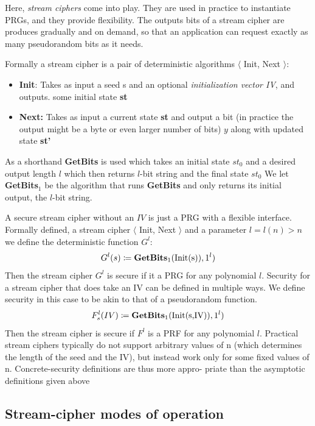 \documentclass[12pt]{article}
\begin{document}
Here, \emph{stream ciphers} come into play. They are used in practice to instantiate PRGs, and they provide flexibility. The outputs bits of a stream cipher are produces gradually and on demand, so that an application can request exactly as many pseudorandom bits as it needs.

Formally a stream cipher is a pair of deterministic algorithms $\langle$ Init, Next $\rangle$:
\begin{itemize}
\item \textbf{Init}: Takes as input a seed s and an optional \emph{initialization vector IV}, and outputs. some initial state \textbf{st}
\item \textbf{Next:} Takes as input a current state \textbf{st} and output a bit (in practice the output might be a byte or even larger number of bits) $y$ along with updated state  \textbf{st'}
\end{itemize}

As a shorthand \textbf{GetBits} is used which takes an initial state $st_0$ and a desired output length $l$ which then returns $l$-bit string and the final state $st_0$
We let \textbf{GetBits}$_1$ be the algorithm that runs \textbf{GetBits} and only returns its initial output, the $l$-bit string.


A secure stream cipher without an $IV$ is just a PRG with a flexible interface.
Formally defined, a stream cipher $\langle$ Init, Next $\rangle$ and a parameter $l = l(n) > n $ we define the deterministic function $G^l$:
\begin{equation*}
G^l(s) \coloneqq \textbf{GetBits}_1(\text{Init(s)}),1^l)
\end{equation*}
Then the stream cipher $G^l$ is secure if it a PRG for any polynomial $l$.
Security for a stream cipher that does take an IV can be defined in multiple
ways. We define security in this case to be akin to that of a pseudorandom
function.
\begin{equation*}
F_s^l(IV) \coloneqq \textbf{GetBits}_1(\text{Init(s,IV)}),1^l)
\end{equation*}
Then the stream cipher is secure if $F^l$ is a PRF for any polynomial $l$. Practical stream ciphers typically do not support arbitrary values of n
(which determines the length of the seed and the IV), but instead work only
for some fixed values of n. Concrete-security definitions are thus more appro-
priate than the asymptotic definitions given above
\subsection{Stream-cipher modes of operation}
\end{document}
